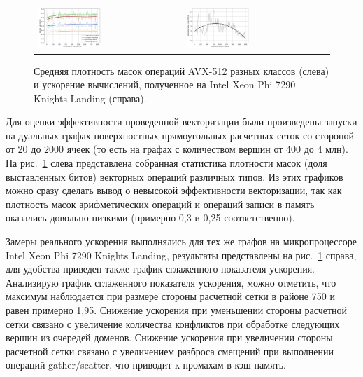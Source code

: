 \documentclass[
11pt,%
tightenlines,%
twoside,%
onecolumn,%
nofloats,%
nobibnotes,%
nofootinbib,%
superscriptaddress,%
noshowpacs,%
centertags]%
{revtex4}
\begin{document}
\begin{figure}[h]
\setcaptionmargin{5mm}
\onelinecaptionsfalse %
\begin{tabular}{ll}
\includegraphics[width=0.45\textwidth]{pics/chart_statistics_eng.png}
&
\includegraphics[width=0.45\textwidth]{pics/chart_speedup_eng.png}
\end{tabular}
\caption{Средняя плотность масок операций AVX-512 разных классов (слева) и ускорение вычислений, полученное на Intel Xeon Phi 7290 Knights Landing (справа).}\label{fig:chart}
\end{figure}

Для оценки эффективности проведенной векторизации были произведены запуски на дуальных графах поверхностных прямоугольных расчетных сеток со стороной от 20 до 2000 ячеек (то есть на графах с количеством вершин от 400 до 4 млн).
На рис.~\ref{fig:chart} слева представлена собранная статистика плотности масок (доля выставленных битов) векторных операций различных типов.
Из этих графиков можно сразу сделать вывод о невысокой эффективности векторизации, так как плотность масок арифметических операций и операций записи в память оказались довольно низкими (примерно 0,3 и 0,25 соответственно).

Замеры реального ускорения выполнялись для тех же графов на микропроцессоре Intel Xeon Phi 7290 Knights Landing, результаты представлены на рис.~\ref{fig:chart} справа, для удобства приведен также график сглаженного показателя ускорения.
Анализирую график сглаженного показателя ускорения, можно отметить, что максимум наблюдается при размере стороны расчетной сетки в районе 750 и равен примерно 1,95.
Снижение ускорения при уменьшении стороны расчетной сетки связано с увеличение количества конфликтов при обработке следующих вершин из очередей доменов.
Снижение ускорения при увеличении стороны расчетной сетки связано с увеличением разброса смещений при выполнении операций gather/scatter, что приводит к промахам в кэш-память.
\end{document}
